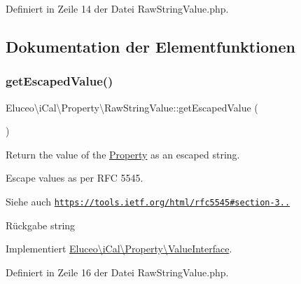 Definiert in Zeile 14 der Datei Raw\+String\+Value.\+php.



\subsection{Dokumentation der Elementfunktionen}
\mbox{\label{class_eluceo_1_1i_cal_1_1_property_1_1_raw_string_value_a4759366e5ac3a3eb9c4b57704c71b05f}} 
\subsubsection{\texorpdfstring{get\+Escaped\+Value()}{getEscapedValue()}\hspace{0.1cm}{\footnotesize\ttfamily [1/3]}}
{\footnotesize\ttfamily Eluceo\textbackslash{}i\+Cal\textbackslash{}\+Property\textbackslash{}\+Raw\+String\+Value\+::get\+Escaped\+Value (\begin{DoxyParamCaption}{ }\end{DoxyParamCaption})}

Return the value of the \mbox{\hyperlink{class_eluceo_1_1i_cal_1_1_property}{Property}} as an escaped string.

Escape values as per R\+FC 5545.

\begin{DoxySeeAlso}{Siehe auch}
\href{https://tools.ietf.org/html/rfc5545#section-3.3.11}{\tt https\+://tools.\+ietf.\+org/html/rfc5545\#section-\/3..}
\end{DoxySeeAlso}
\begin{DoxyReturn}{Rückgabe}
string 
\end{DoxyReturn}


Implementiert \mbox{\hyperlink{interface_eluceo_1_1i_cal_1_1_property_1_1_value_interface_a408412ae5d11fd3f239c7985aede8c32}{Eluceo\textbackslash{}i\+Cal\textbackslash{}\+Property\textbackslash{}\+Value\+Interface}}.



Definiert in Zeile 16 der Datei Raw\+String\+Value.\+php.

\mbox{\label{class_eluceo_1_1i_cal_1_1_property_1_1_raw_string_value_a4759366e5ac3a3eb9c4b57704c71b05f}} 

